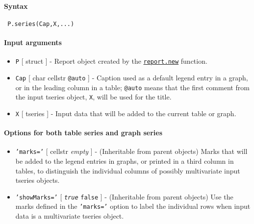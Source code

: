


	\paragraph{Syntax}
 
 \begin{verbatim}
 P.series(Cap,X,...)
 \end{verbatim}
 
 \paragraph{Input arguments}
 
 \begin{itemize}
 \item
   \texttt{P} {[} struct {]} - Report object created by the
   \href{report/new}{\texttt{report.new}} function.
 \item
   \texttt{Cap} {[} char \textbar{} cellstr \textbar{} \texttt{@auto} {]}
   - Caption used as a default legend entry in a graph, or in the leading
   column in a table; \texttt{@auto} means that the first comment from
   the input tseries object, \texttt{X}, will be used for the title.
 \item
   \texttt{X} {[} tseries {]} - Input data that will be added to the
   current table or graph.
 \end{itemize}
 
 \paragraph{Options for both table series and graph series}
 
 \begin{itemize}
 \item
   \texttt{'marks='} {[} cellstr \textbar{} \emph{empty} {]} -
   (Inheritable from parent objects) Marks that will be added to the
   legend entries in graphs, or printed in a third column in tables, to
   distinguish the individual columns of possibly multivariate input
   tseries objects.
 \item
   \texttt{'showMarks='} {[} \emph{\texttt{true}} \textbar{}
   \texttt{false} {]} - (Inheritable from parent objects) Use the marks
   defined in the \texttt{'marks='} option to label the individual rows
   when input data is a multivariate tseries object.
 \end{itemize}
 
